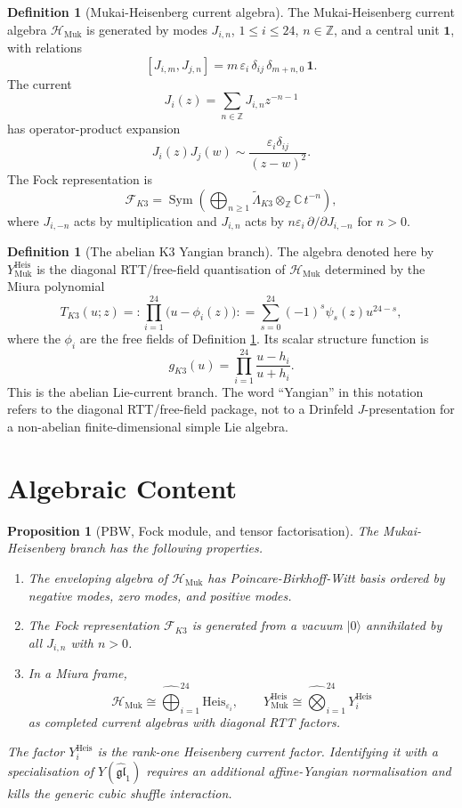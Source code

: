 \documentclass[11pt]{article}
\newtheorem{proposition}[theorem]{Proposition}
\theoremstyle{definition}
\newtheorem{definition}[theorem]{Definition}
\theoremstyle{remark}
\DeclareMathOperator{\Sym}{Sym}
\newcommand{\Fock}{\mathcal{F}_{K3}}
\newcommand{\Hmuk}{\mathcal{H}_{\mathrm{Muk}}}
\newcommand{\Lmuk}{\widetilde{\Lambda}_{K3}}
\newcommand{\LmukC}{\Lmuk \otimes_{\mathbb{Z}} \mathbb{C}}
\newcommand{\YHeis}{Y^{\mathrm{Heis}}_{\mathrm{Muk}}}
\begin{document}
\begin{definition}[Mukai-Heisenberg current algebra]
\label{def:mukai-heisenberg}
The Mukai-Heisenberg current algebra $\Hmuk$ is generated by modes
$J_{i,n}$, $1 \leq i \leq 24$, $n \in \mathbb{Z}$, and a central unit
$\mathbf{1}$, with relations
\[
  [J_{i,m},J_{j,n}]
  =
  m\,\varepsilon_i\,\delta_{ij}\,\delta_{m+n,0}\,\mathbf{1}.
\]
The current
\[
  J_i(z) = \sum_{n \in \mathbb{Z}} J_{i,n} z^{-n-1}
\]
has operator-product expansion
\[
  J_i(z)J_j(w) \sim
  \frac{\varepsilon_i\delta_{ij}}{(z-w)^2}.
\]
The Fock representation is
\[
  \Fock =
  \Sym\!\left(
    \bigoplus_{n\geq 1}\LmukC\, t^{-n}
  \right),
\]
where $J_{i,-n}$ acts by multiplication and $J_{i,n}$ acts by
$n\varepsilon_i\,\partial/\partial J_{i,-n}$ for $n>0$.
\end{definition}

\begin{definition}[The abelian K3 Yangian branch]
\label{def:heisenberg-branch}
The algebra denoted here by $\YHeis$ is the diagonal RTT/free-field
quantisation of $\Hmuk$ determined by the Miura polynomial
\[
  T_{K3}(u;z)
  =
  :\prod_{i=1}^{24}\bigl(u-\phi_i(z)\bigr):
  =
  \sum_{s=0}^{24}(-1)^s\psi_s(z)u^{24-s},
\]
where the $\phi_i$ are the free fields of Definition
\ref{def:mukai-heisenberg}. Its scalar structure function is
\[
  g_{K3}(u)
  =
  \prod_{i=1}^{24}\frac{u-h_i}{u+h_i}.
\]
This is the abelian Lie-current branch. The word ``Yangian'' in this
notation refers to the diagonal RTT/free-field package, not to a
Drinfeld $J$-presentation for a non-abelian finite-dimensional simple
Lie algebra.
\end{definition}

\section{Algebraic Content}
\label{sec:algebraic-content}

\begin{proposition}[PBW, Fock module, and tensor factorisation]
\label{prop:pbw-fock-factorisation}
The Mukai-Heisenberg branch has the following properties.
\begin{enumerate}[label=\textup{(\alph*)}]
\item The enveloping algebra of $\Hmuk$ has Poincare-Birkhoff-Witt
basis ordered by negative modes, zero modes, and positive modes.
\item The Fock representation $\Fock$ is generated from a vacuum
$|0\rangle$ annihilated by all $J_{i,n}$ with $n>0$.
\item In a Miura frame,
\[
  \Hmuk \cong \widehat{\bigoplus}_{i=1}^{24}\mathrm{Heis}_{\varepsilon_i},
  \qquad
  \YHeis \cong
  \widehat{\bigotimes}_{i=1}^{24}Y^{\mathrm{Heis}}_i
\]
as completed current algebras with diagonal RTT factors.
\end{enumerate}
The factor $Y^{\mathrm{Heis}}_i$ is the rank-one Heisenberg current
factor. Identifying it with a specialisation of
$Y(\widehat{\mathfrak{gl}}_1)$ requires an additional affine-Yangian
normalisation and kills the generic cubic shuffle interaction.
\end{proposition}
\end{document}
